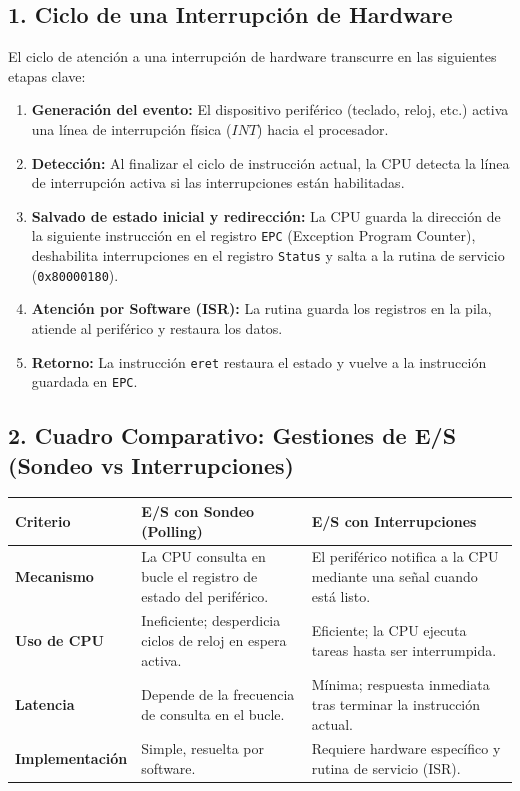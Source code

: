 \documentclass[12pt,a4paper]{article}
\begin{document}
\subsection*{1. Ciclo de una Interrupción de Hardware}
El ciclo de atención a una interrupción de hardware transcurre en las siguientes etapas clave:
\begin{enumerate}
    \item \textbf{Generación del evento:} El dispositivo periférico (teclado, reloj, etc.) activa una línea de interrupción física ($INT$) hacia el procesador.
    \item \textbf{Detección:} Al finalizar el ciclo de instrucción actual, la CPU detecta la línea de interrupción activa si las interrupciones están habilitadas.
    \item \textbf{Salvado de estado inicial y redirección:} La CPU guarda la dirección de la siguiente instrucción en el registro \texttt{EPC} (Exception Program Counter), deshabilita interrupciones en el registro \texttt{Status} y salta a la rutina de servicio (\texttt{0x80000180}).
    \item \textbf{Atención por Software (ISR):} La rutina guarda los registros en la pila, atiende al periférico y restaura los datos.
    \item \textbf{Retorno:} La instrucción \texttt{eret} restaura el estado y vuelve a la instrucción guardada en \texttt{EPC}.
\end{enumerate}

\subsection*{2. Cuadro Comparativo: Gestiones de E/S (Sondeo vs Interrupciones)}

\begin{table}[h!]
\centering
\renewcommand{\arraystretch}{1.5} %
\begin{tabular}{|p{3.5cm}|p{5.5cm}|p{5.5cm}|}
\hline
\textbf{Criterio} & \textbf{E/S con Sondeo (Polling)} & \textbf{E/S con Interrupciones} \\
\hline
\textbf{Mecanismo} & La CPU consulta en bucle el registro de estado del periférico. & El periférico notifica a la CPU mediante una señal cuando está listo. \\
\hline
\textbf{Uso de CPU} & Ineficiente; desperdicia ciclos de reloj en espera activa. & Eficiente; la CPU ejecuta tareas hasta ser interrumpida. \\
\hline
\textbf{Latencia} & Depende de la frecuencia de consulta en el bucle. & Mínima; respuesta inmediata tras terminar la instrucción actual. \\
\hline
\textbf{Implementación} & Simple, resuelta por software. & Requiere hardware específico y rutina de servicio (ISR). \\
\hline
\end{tabular}
\end{table}
\end{document}
